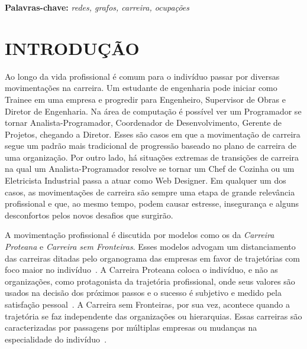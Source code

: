 \documentclass[12pt,a4paper]{article}
\begin{document}
\begin{flushleft}
{\bf Palavras-chave:} \it{redes, grafos, carreira, ocupações}
\end{flushleft}

\newpage
\thispagestyle{empty}
\tableofcontents

\newpage
\pagestyle{plain}
\renewcommand{\baselinestretch}{1.5}
\normalsize

\listoftodos[Notas]

\section{INTRODUÇÃO}

Ao longo da vida profissional é comum para o indivíduo passar por diversas movimentações na carreira. Um estudante de engenharia pode iniciar como Trainee em uma empresa e progredir para Engenheiro, Supervisor de Obras e Diretor de Engenharia. Na área de computação é possível ver um Programador se tornar Analista-Programador, Coordenador de Desenvolvimento, Gerente de Projetos, chegando a Diretor. Esses são casos em que a movimentação de carreira segue um padrão mais tradicional de progressão baseado no plano de carreira de uma organização. Por outro lado, há situações extremas de transições de carreira na qual um Analista-Programador resolve se tornar um Chef de Cozinha ou um Eletricista Industrial passa a atuar como Web Designer. Em qualquer um dos casos, as movimentações de carreira são sempre uma etapa de grande relevância profissional e que, ao mesmo tempo, podem causar estresse, insegurança e alguns desconfortos pelos novos desafios que surgirão.

A movimentação profissional é discutida por modelos como os da \textit{Carreira Proteana} e \textit{Carreira sem Fronteiras}. Esses modelos advogam um distanciamento das carreiras ditadas pelo organograma das empresas em favor de trajetórias com foco maior no indivíduo~\cite{Bendassolli2009-bg}. A Carreira Proteana coloca o indivíduo, e não as organizações, como protagonista da trajetória profissional, onde seus valores são usados na decisão dos próximos passos e o sucesso é subjetivo e medido pela satisfação pessoal~\cite{Hall2004-ke}. A Carreira sem Fronteiras, por sua vez, acontece quando a trajetória se faz independente das organizações ou hierarquias. Essas carreiras são caracterizadas por passagens por múltiplas empresas ou mudanças na especialidade do indivíduo~\cite{Arthur1994-qq}.
\end{document}
